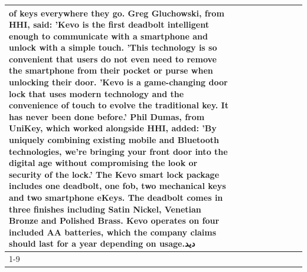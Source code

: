 \begin{table}[H]
\begin{tabular}{lllrlllll}
of keys everywhere they go. Greg Gluchowski, from HHI, said: 'Kevo is the first deadbolt intelligent enough to communicate with a smartphone and unlock with a simple touch. 'This technology is so convenient that users do not even need to remove the smartphone from their pocket or purse when unlocking their door. 'Kevo is a game-changing door lock that uses modern technology and the convenience of touch to evolve the traditional key. It has never been done before.' Phil Dumas, from UniKey, which worked alongside HHI, added: 'By uniquely combining existing mobile and Bluetooth technologies, we’re bringing your front door into the digital age without compromising the look or security of the lock.' The Kevo smart lock package includes one deadbolt, one fob, two mechanical keys and two smartphone eKeys. The deadbolt comes in three finishes including Satin Nickel, Venetian Bronze and Polished Brass. Kevo operates on four included AA batteries, which the company claims should last for a year depending on usage.ديد \\
\cline{1-9}

\end{tabular}
\end{table}
